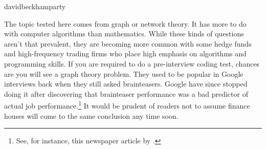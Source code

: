\begin{answer}{davidbeckhamparty}
\begin{center}
\begin{tikzpicture}[scale=0.6]
\end{tikzpicture}
\end{center}
The topic tested here comes from graph or network theory.
It has more to do with computer algorithms than mathematics.
While these kinds of questions aren't that prevalent, they are becoming more common with some hedge funds and high-frequency trading firms who place high emphasis on algorithms and programming skills.
If you are required to do a pre-interview coding test, chances are you will see a graph theory problem.
They used to be popular in Google interviews back when they still asked brainteasers.
Google have since stopped doing it after discovering that brainteaser performance was a bad predictor of actual job performance.\footnote{See, for instance, this newspaper article by \citet{GoogleBrainteasers}.}
It would be prudent of readers not to assume finance houses will come to the same conclusion any time soon.


\end{answer}
